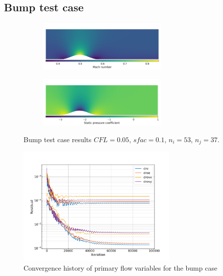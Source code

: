\documentclass{article}
\begin{document}
\subsection{Bump test case}

\begin{figure}[H]
    \centering
    \begin{subfigure}{0.99\textwidth}
        \centering
        \includegraphics[width=0.7\textwidth]{figures/bump_mach.png}
        \caption{}
        \label{fig:bump_mach}
    \end{subfigure}
    \begin{subfigure}{0.99\textwidth}
        \centering
        \includegraphics[width=0.7\textwidth]{figures/bump_cp.png}
        \caption{}
        \label{fig:bump_cp}
    \end{subfigure}
    \caption{Bump test case results $CFL = 0.05$, $sfac = 0.1$, $n_i = 53$, $n_j = 37$.}
\end{figure}

\begin{figure}[H]
    \centering
    \includegraphics[width=0.7\textwidth]{figures/bump_conv.png}
    \caption{Convergence history of primary flow variables for the bump case}
    \label{fig:bump_conv}
\end{figure}
\end{document}
